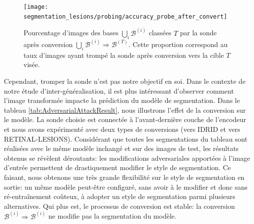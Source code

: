 \begin{figure}
	\centering
	\texttt{[image: segmentation\_lesions/probing/accuracy\_probe\_after\_convert]}
	\caption{Pourcentage d'images des bases $\bigcup_i \mathcal{B}^{(i)}$ classées $T$ par la sonde après conversion $\bigcup_i \mathcal{B}^{(i)} \Rightarrow \mathcal{B}^{(T)}$. Cette proportion correspond au taux d'images ayant trompé la sonde après conversion vers la cible $T$ visée.}
	\label{fig:labelConversionSuccess}
\end{figure}

Cependant, tromper la sonde n'est pas notre objectif en soi. Dans le contexte de notre étude d'inter-généralisation, il est plus intéressant d'observer comment l'image transformée impacte la prédiction du modèle de segmentation. Dans le tableau \ref{tab:AdversarialAttackResult}, nous illustrons l'effet de la conversion sur le modèle. La sonde choisie est connectée à l'avant-dernière couche de l'encodeur et nous avons expérimenté avec deux types de conversions (vers IDRID et vers RETINAL-LESIONS). Considérant que toutes les segmentations du tableau sont réalisées avec le même modèle inchangé et sur des images de test, les résultats obtenus se révèlent déroutants: les modifications adversariales apportées à l'image d'entrée permettent de drastiquement modifier le style de segmentation. Ce faisant, nous obtenons une très grande flexibilité sur le style de segmentation en sortie: un même modèle peut-être configuré, sans avoir à le modifier et donc sans ré-entraînement coûteux, à adopter un style de segmentation parmi plusieurs alternatives. Qui plus est, le processus de conversion est stable: la conversion $\mathcal{B}^{(i)} \Rightarrow \mathcal{B}^{(i)}$ ne modifie pas la segmentation du modèle.

